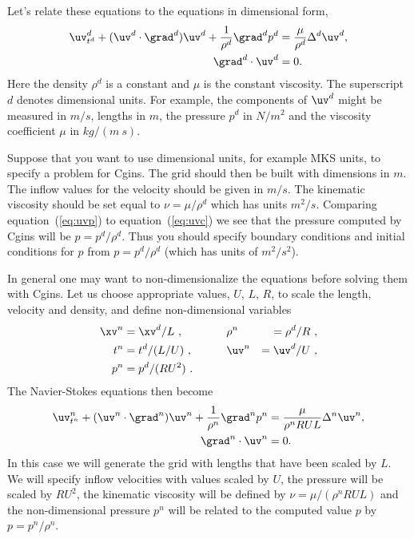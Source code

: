 \documentclass[10pt]{article}
\begin{document}
\newcommand{\tp}{t^d}
\newcommand{\xvp}{\xv^d}
\newcommand{\uvp}{\uv^d}
\newcommand{\pp}{p^d}
\newcommand{\rhop}{\rho^d}
\newcommand{\Deltap}{\Delta^d}
\newcommand{\gradp}{\grad^d}

Let's relate these equations to the equations in dimensional form,
\begin{align}
   \uvp_{\tp} + (\uvp\cdot\gradp)\uvp + {1\over\rhop} \gradp \pp &= \frac{\mu}{\rhop} \Deltap \uvp, 
                          \label{eq:uvp}\\
   \gradp\cdot\uvp &= 0.
\end{align}
Here the density $\rhop$ is
a constant and $\mu$ is the constant viscosity.
The superscript $d$ denotes dimensional units. For example, the components of  $\uvp$ might be
measured in $m/s$, lengths in $m$, the pressure $\pp$ in $N/m^2$ and the viscosity coefficient
$\mu$ in $kg/(m~s)$.  

Suppose that you want to use dimensional units, for example MKS units, to specify a problem for Cgins.
The grid should then be built with dimensions in $m$. The inflow values
for the velocity should be given in $m/s$. The kinematic viscosity should be
set equal to $\nu=\mu/\rhop$ which has units $m^2/s$. 
Comparing equation~(\ref{eq:uvp}) to equation~(\ref{eq:uvc})
we see that the pressure computed by Cgins will be $p=\pp/\rhop$. Thus you should
specify boundary conditions and initial conditions for $p$ from $p=\pp/\rhop$ (which has
units of $m^2/s^2$). 



\newcommand{\tnd}{t^n}
\newcommand{\xvt}{\xv^n}
\newcommand{\uvt}{\uv^n}
\newcommand{\pt}{p^n}
\newcommand{\rhot}{\rho^n}
\newcommand{\Deltat}{\Delta^n}
\newcommand{\gradt}{\grad^n}
In general one may want to non-dimensionalize the equations before solving them
with Cgins. 
Let us choose appropriate values, $U$, $L$, $R$,
to scale the length, velocity and density,
and define non-dimensional variables
\begin{alignat}{3}
   \xvt & = \xvp/L  ~, &\qquad&  \rhot &= \rhop/R  ~,\\
   \tnd & = \tp/(L/U) ~, &&  \uvt &= {\uvp/U} ~, \\
   \pt &= \pp/(R U^2)~.
\end{alignat}
The Navier-Stokes equations then become
\begin{align}
   \uvt_{\tnd} + (\uvt\cdot\gradt)\uvt + {1\over\rhot} \gradt \pt &= \frac{\mu}{\rhot R U L} \Deltat \uvt, 
                          \label{eq:uvt}\\
   \gradt\cdot\uvt &= 0.
\end{align}
In this case we will generate the grid with lengths that have been scaled by $L$. We will specify inflow
velocities with values scaled by $U$, the pressure will be scaled by $R U^2$,
the kinematic viscosity will be defined by
$\nu=\mu/(\rhot R U L)$ and the non-dimensional pressure $\pt$ will be related to
the computed value $p$ by $p=\pt/\rhot$.
\end{document}
